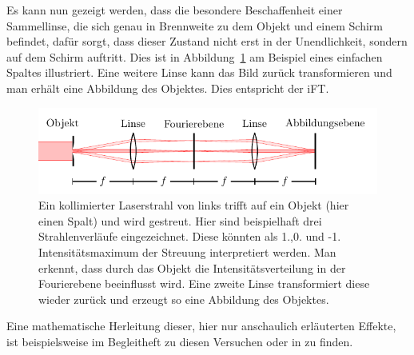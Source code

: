 Es kann nun gezeigt werden, dass die besondere Beschaffenheit einer Sammellinse, die sich genau in Brennweite zu dem Objekt und einem Schirm befindet, dafür sorgt, dass dieser Zustand nicht erst in der Unendlichkeit, sondern auf dem Schirm auftritt. Dies ist in Abbildung~\ref{fig:ft-an-linse} am Beispiel eines einfachen Spaltes illustriert. Eine weitere Linse kann das Bild zurück transformieren und man erhält eine Abbildung des Objektes. Dies entspricht der iFT.

\begin{figure}[h]
	\centering
	\includegraphics[scale=1]{graphs/theorie/abbildung.pdf}
	\caption[Illustration: Inverse und Fouriertransformation an Linsen]{
		Ein kollimierter Laserstrahl von links trifft auf ein Objekt (hier einen Spalt) und wird gestreut. Hier sind beispielhaft drei Strahlenverläufe eingezeichnet. Diese könnten als 1.,0. und -1. Intensitätsmaximum der Streuung interpretiert werden. Man erkennt, dass durch das Objekt die Intensitätsverteilung in der Fourierebene beeinflusst wird. Eine zweite Linse transformiert diese wieder zurück und erzeugt so eine Abbildung des Objektes.
	} \label{fig:ft-an-linse}
\end{figure}


Eine mathematische Herleitung dieser, hier nur anschaulich erläuterten Effekte, ist beispielsweise im Begleitheft zu diesen Versuchen oder in\cite[Kap. 2.3]{stossel_fourieroptik:_1993} zu finden.
